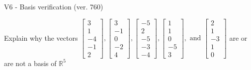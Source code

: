 \begin{exercise}
  \begin{exerciseTitle}V6 - Basis verification (ver. 760)\end{exerciseTitle}
  \begin{exerciseStatement}
    Explain why the vectors \(\left[\begin{array}{r}
3 \\
1 \\
-4 \\
-1 \\
2
\end{array}\right] , \left[\begin{array}{r}
3 \\
-1 \\
0 \\
-2 \\
4
\end{array}\right] , \left[\begin{array}{r}
-5 \\
2 \\
-5 \\
-3 \\
-4
\end{array}\right] , \left[\begin{array}{r}
1 \\
1 \\
0 \\
-5 \\
3
\end{array}\right] , \text{ and } \left[\begin{array}{r}
2 \\
1 \\
-3 \\
1 \\
0
\end{array}\right]\) are or are not a basis of \(\mathbb{R}^5\)	



\end{exerciseStatement}
\end{exercise}
